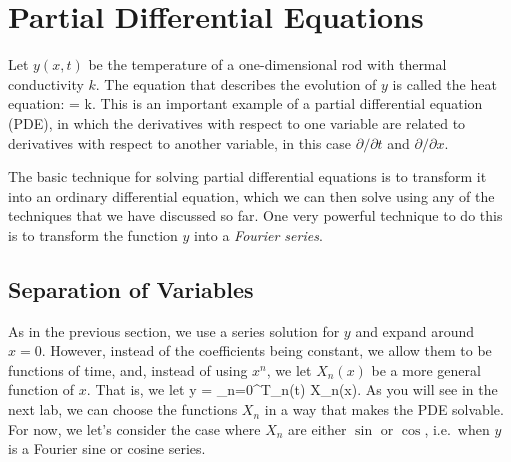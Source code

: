 \documentclass[12pt]{article}
\begin{document}
\newpage
\section{Partial Differential Equations}
Let $y(x,t)$ be the temperature of a one-dimensional rod with thermal 
conductivity $k$. The equation that describes the evolution of $y$ is 
called the heat equation:
\be
{} =  k.
\ee
This is an important example of a partial differential equation (PDE), in which
the derivatives with respect to one variable are related to derivatives with
respect to another variable, in this case $\partial/\partial t$ and  
$\partial/\partial x$. 

The basic technique for solving partial differential equations is to transform
it into an ordinary differential equation, which we can then solve using any
of the techniques that we have discussed so far. One very powerful technique
to do this is to transform the function $y$ into a \emph{Fourier series}.

\subsection{Separation of Variables}
As in the previous section, we use a series solution for $y$ and expand around
 $x=0$. However, instead of the coefficients being constant, we allow them to 
be functions of time, and, instead of using $x^n$, we let $X_n(x)$ be a more
general function of $x$. That is, we let
\be
y = \sum_{n=0}^\infty T_n(t) X_n(x).
\ee
As you will see in the next lab, we can choose the functions $X_n$ in a way
that makes the PDE solvable. For now, we let's consider the case where $X_n$ are
either $\sin$ or $\cos$, i.e.\ when $y$ is a Fourier sine or cosine series.
\end{document}
